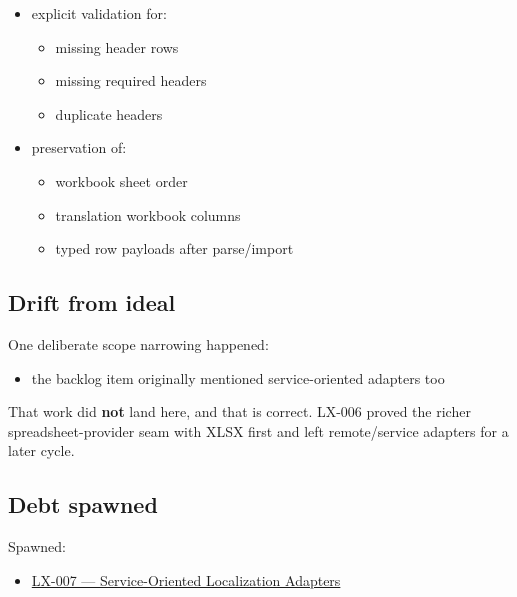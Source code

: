 \begin{itemize}
  \begin{itemize}
  \tightlist
  \item
    \texttt{E\allowbreak{}x\allowbreak{}c\allowbreak{}h\allowbreak{}a\allowbreak{}n\allowbreak{}g\allowbreak{}e\allowbreak{}W\allowbreak{}o\allowbreak{}r\allowbreak{}k\allowbreak{}b\allowbreak{}o\allowbreak{}o\allowbreak{}k} -\textgreater{} XLSX bytes
  \item
    XLSX bytes -\textgreater{} \texttt{E\allowbreak{}x\allowbreak{}c\allowbreak{}h\allowbreak{}a\allowbreak{}n\allowbreak{}g\allowbreak{}e\allowbreak{}W\allowbreak{}o\allowbreak{}r\allowbreak{}k\allowbreak{}b\allowbreak{}o\allowbreak{}o\allowbreak{}k}
  \end{itemize}
\item
  explicit validation for:

  \begin{itemize}
  \tightlist
  \item
    missing header rows
  \item
    missing required headers
  \item
    duplicate headers
  \end{itemize}
\item
  preservation of:

  \begin{itemize}
  \tightlist
  \item
    workbook sheet order
  \item
    translation workbook columns
  \item
    typed row payloads after parse/import
  \end{itemize}
\end{itemize}

\subsection{Drift from ideal}\label{record-193-drift-from-ideal}

One deliberate scope narrowing happened:

\begin{itemize}
\tightlist
\item
  the backlog item originally mentioned service-oriented adapters too
\end{itemize}

That work did \textbf{not} land here, and that is correct. LX-006 proved the richer spreadsheet-provider seam with XLSX first and left remote/service adapters for a later cycle.

\subsection{Debt spawned}\label{record-193-debt-spawned}

Spawned:

\begin{itemize}
\tightlist
\item
  \href{https://github.com/flyingrobots/bijou/blob/cbd70612140e7a450d764b3c7be1c6af878b99bc/docs/method/graveyard/legacy-backlog/LX-007-service-oriented-localization-adapters.md}{LX-007 --- Service-Oriented Localization Adapters}
\end{itemize}

